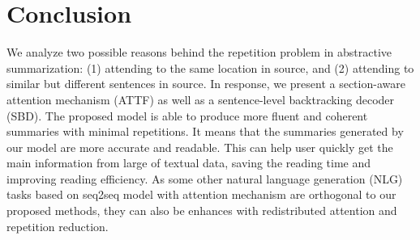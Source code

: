 \section{Conclusion}
\label{sec:conclude}
We analyze two possible reasons behind the repetition problem in abstractive
summarization: (1) attending to the same location in source,
and (2) attending to similar but different sentences in source. 
In response, we present a section-aware attention mechanism (ATTF)
as well as a sentence-level backtracking decoder (SBD). 
The proposed model is able 
to produce more fluent and coherent summaries with minimal repetitions.
It means that the summaries generated by our model are more accurate and 
readable. This can help user quickly get the main information from large of textual data,
saving the reading time and improving reading efficiency.
As some other natural language generation (NLG) tasks based on seq2seq model with attention mechanism
are orthogonal to our proposed methods,
they can also be enhances with redistributed attention and repetition reduction.

